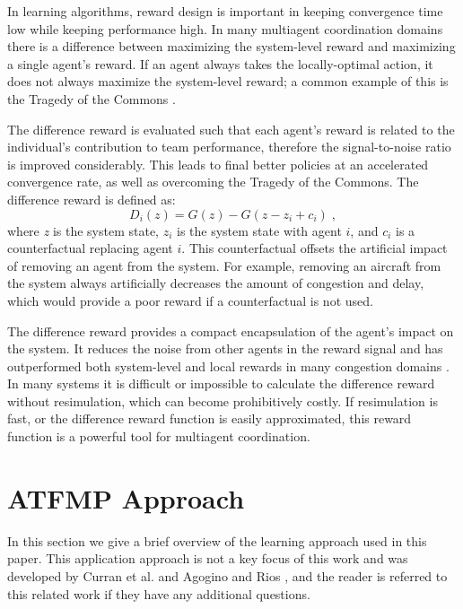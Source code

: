 \documentclass{aamas2014}
\begin{document}
In learning algorithms, reward design is important in keeping convergence time low while keeping performance high. In many multiagent coordination domains there is a difference between maximizing the system-level reward and maximizing a single agent's reward. If an agent always takes the locally-optimal action, it does not always maximize the system-level reward; a common example of this is the Tragedy of the Commons \cite{Hardin}.

The difference reward \cite{tumer-wolpert_jair02} is evaluated such that each agent's reward is related to the individual's contribution to team performance, therefore the signal-to-noise ratio is improved considerably. This leads to final better policies at an accelerated convergence rate, as well as overcoming the Tragedy of the Commons. The difference reward is defined as:
%
\begin{equation}
D_i(z) = G(z) - G(z - z_i + c_i)\;,
\end{equation}
%
where \textit{z} is the system state, $z_i$ is the system state with agent $i$, and $c_i$ is a counterfactual replacing agent $i$. This counterfactual offsets the artificial impact of removing an agent from the system. For example, removing an aircraft from the system always artificially decreases the amount of congestion and delay, which would provide a poor reward if a counterfactual is not used.

The difference reward provides a compact encapsulation of the agent's impact on the system. It reduces the noise from other agents in the reward signal and has outperformed both system-level and local rewards in many congestion domains \cite{AAMAS12-agmon, Agogino:2012:ELS:2330163.2330306, Colby:2012:SFF:2343576.2343637, tumer-wolpert_jair02}. In many systems it is difficult or impossible to calculate the difference reward without resimulation, which can become prohibitively costly. If resimulation is fast, or the difference reward function is easily approximated, this reward function is a powerful tool for multiagent coordination.

\section{ATFMP Approach}

In this section we give a brief overview of the learning approach used in this paper. This application approach is not a key focus of this work and was developed by Curran et al. \cite{Curran:2013:AHC:2484920.2485183} and Agogino and Rios \cite{Agogino:2009:EEM:1570256.1570258, Rios}, and the reader is referred to this related work if they have any additional questions.
\end{document}
